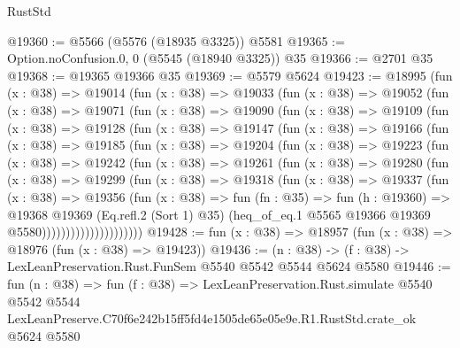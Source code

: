 \begin{lexlean}{RustStd}
\begin{coremodule}
@19360 := @5566 (@5576 (@18935 @3325)) @5581
@19365 := Option.noConfusion.{0, 0} (@5545 (@18940 @3325)) @35
@19366 := @2701 @35
@19368 := @19365 @19366 @35
@19369 := @5579 @5624
@19423 := @18995
    (fun (x : @38) =>
    @19014
      (fun (x : @38) =>
      @19033
        (fun (x : @38) =>
        @19052
          (fun (x : @38) =>
          @19071
            (fun (x : @38) =>
            @19090
              (fun (x : @38) =>
              @19109
                (fun (x : @38) =>
                @19128
                  (fun (x : @38) =>
                  @19147
                    (fun (x : @38) =>
                    @19166
                      (fun (x : @38) =>
                      @19185
                        (fun (x : @38) =>
                        @19204
                          (fun (x : @38) =>
                          @19223
                            (fun (x : @38) =>
                            @19242
                              (fun (x : @38) =>
                              @19261
                                (fun (x : @38) =>
                                @19280
                                  (fun (x : @38) =>
                                  @19299
                                    (fun (x : @38) =>
                                    @19318
                                      (fun (x : @38) =>
                                      @19337
                                        (fun (x : @38) =>
                                        @19356
                                          (fun (x : @38) =>
                                          fun (fn : @35) =>
                                          fun (h : @19360) =>
                                          @19368
                                            @19369
                                            (Eq.refl.{2} (Sort 1) @35)
                                            (heq_of_eq.{1}
                                              @5565
                                              @19366
                                              @19369
                                              @5580)))))))))))))))))))))
@19428 := fun (x : @38) => @18957 (fun (x : @38) => @18976 (fun (x : @38) => @19423))
@19436 := (n : @38) -> (f : @38) -> LexLeanPreservation.Rust.FunSem @5540 @5542 @5544 @5624 @5580
@19446 := fun (n : @38) =>
  fun (f : @38) =>
  LexLeanPreservation.Rust.simulate
    @5540
    @5542
    @5544
    LexLeanPreserve.C70f6e242b15ff5fd4e1505de65e05e9e.R1.RustStd.crate_ok
    @5624
    @5580
\end{coremodule}
\end{lexlean}
